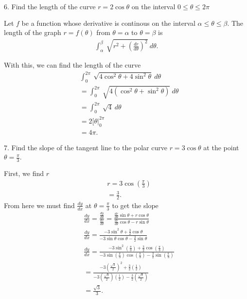 \documentclass{report}
\begin{document}
    \pagebreak \bigbreak \noindent 
    \begin{mdframed}
        6. Find the length of the curve $r=2\cos{\theta} $ on the interval $0 \leq \theta \leq 2\pi $
    \end{mdframed}
    \bigbreak \noindent 
    \begin{remark}
        
        Let $f$ be a function whose derivative is continous on the interval $\alpha \leq \theta \leq \beta$. The length of the graph $r=f(\theta )$ from $\theta =\alpha$ to $\theta =\beta$ is 
        \begin{align*}
            \int_{\alpha}^{\beta}\ \sqrt{r^{2} + \left(\frac{dr}{d\theta }\right)^{2}}\ d\theta 
        .\end{align*}
    \end{remark}
    \bigbreak \noindent 
    With this, we can find the length of the curve 
    \begin{align*}
        &\int_{0}^{2\pi}\ \sqrt{4\cos^{2}{\theta} + 4\sin^{2}{\theta }}\ d\theta  \\
        &=\int_{0}^{2\pi}\ \sqrt{4(\cos^{2}{\theta } + \sin^{2}{\theta })}\ d\theta \\
        &=\int_{0}^{2\pi}\ \sqrt{4}\ d\theta  \\
        &=2\bigg[\theta \bigg|_0^{2\pi} \\
        &=4\pi
    .\end{align*}

    \bigbreak \noindent 
    \begin{mdframed}
        7. Find the slope of the tangent line to the polar curve $r=3\cos{\theta}$ at the point $\theta =\frac{\pi}{3} $.
    \end{mdframed}
    \bigbreak \noindent 
    First, we find $r$
    \begin{align*}
        &r = 3\cos{\left(\frac{\pi}{3}\right)} \\
        &=\frac{3}{2}
    .\end{align*}
    From here we must find $\frac{dy}{dx}$ at $\theta =\frac{\pi}{3}$ to get the slope
    \begin{align*}
        &\frac{dy}{dx} = \frac{\frac{dy}{d\theta }}{\frac{dx}{d\theta }} = \frac{\frac{dr}{d\theta}\sin{\theta } + r\cos{\theta }}{\frac{dr}{d\theta }\cos{\theta } - r\sin{\theta }}\\
        &\frac{dy}{dx} = \frac{-3\sin^{2}{\theta}+\frac{3}{2}\cos{\theta }}{-3\sin{\theta }\cos{\theta } - \frac{3}{2}\sin{\theta }}  \\
        &\frac{dy}{dx} = \frac{-3\sin^{2}{\left(\frac{\pi}{3}\right)}+\frac{3}{2}\cos{\left(\frac{\pi}{3}\right) }}{-3\sin{\left(\frac{\pi}{3}\right) }\cos{\left(\frac{\pi}{3}\right) } - \frac{3}{2}\sin{\left(\frac{\pi}{3}\right) }}  \\
        &=\frac{-3\left(\frac{\sqrt{3}}{2}\right)^{2}+\frac{3}{2}\left(\frac{1}{2}\right)}{-3\left(\frac{\sqrt{3}}{2}\right)\left(\frac{1}{2}\right)-\frac{3}{2}\left(\frac{\sqrt{3}}{2}\right)} \\
        &=\frac{\sqrt{3}}{3}
    .\end{align*}
\end{document}
